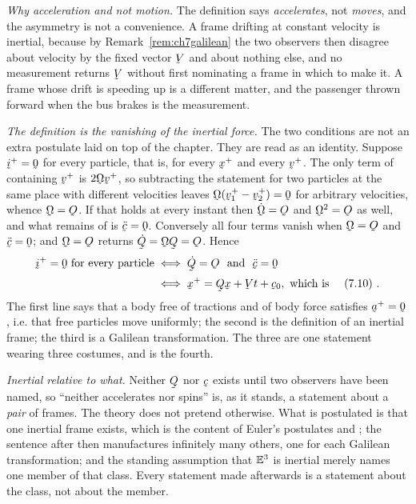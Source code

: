 \begin{remark}
\emph{Why acceleration and not motion.} The definition says
\emph{accelerates}, not \emph{moves}, and the asymmetry is not a
convenience. A frame drifting at constant velocity is inertial, because
by Remark~\ref{rem:ch7galilean} the two observers then disagree about
velocity by the fixed vector $\bV$ and about nothing else, and no
measurement returns $\bV$ without first nominating a frame in which to
make it. A frame whose drift is speeding up is a different matter, and
the passenger thrown forward when the bus brakes is the measurement.

\emph{The definition is the vanishing of the inertial force.} The two
conditions are not an extra postulate laid on top of the chapter. They
are  read as an identity. Suppose $\vek{i}^{+}=\bze$ for every
particle, that is, for every $\bx^{+}$ and every $\bv^{+}$. The only term
of  containing $\bv^{+}$ is $2\bOm\bv^{+}$, so subtracting the
statement for two particles at the same place with different velocities
leaves $\bOm(\bv^{+}_{1}-\bv^{+}_{2})=\bze$ for arbitrary velocities,
whence $\bOm=\Ob$. If that holds at every instant then $\dot\bOm=\Ob$ and
$\bOm^{2}=\Ob$ as well, and what remains of  is
$\ddot\bc=\bze$. Conversely all four terms vanish when $\bOm=\Ob$ and
$\ddot\bc=\bze$; and $\bOm=\Ob$ returns $\dot\bQ=\bOm\bQ=\Ob$. Hence
\[
\begin{aligned}
   \vek{i}^{+}=\bze\ \text{for every particle}
   &\iff \dot\bQ=\Ob\ \ \text{and}\ \ \ddot\bc=\bze\\[0.6mm]
   &\iff \bx^{+}=\bQ\bx+\bV t+\bc_{0},\ \text{which is \eqr{7.10}} .
\end{aligned}
\]
The first line says that a body free of tractions and of body force
satisfies $\ba^{+}=\bze$, i.e. that free particles move uniformly; the
second is the definition of an inertial frame; the third is a Galilean
transformation. The three are one statement wearing three costumes, and
 is the fourth.

\emph{Inertial relative to what.} Neither $\bQ$ nor $\bc$ exists until
two observers have been named, so ``neither accelerates nor spins'' is,
as it stands, a statement about a \emph{pair} of frames. The theory does
not pretend otherwise. What is postulated is that one inertial frame
exists, which is the content of Euler's postulates  and
; the sentence after  then manufactures infinitely
many others, one for each Galilean transformation; and the standing
assumption that $\mathbb{E}^{3}$ is inertial merely names one member of that class.
Every statement made afterwards is a statement about the class, not about
the member.


\end{remark}
